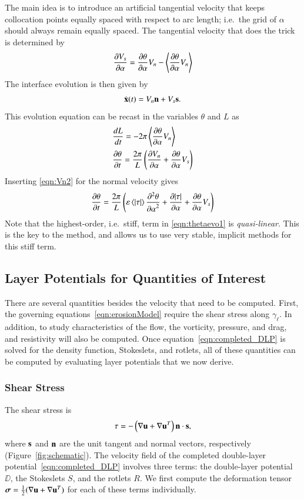 \documentclass[preprint, 10pt]{elsarticle}
\begin{document}
The main idea is to introduce an artificial tangential velocity that keeps collocation points equally spaced with respect to arc length; i.e.~the grid of $\alpha$ should always remain equally spaced. The tangential velocity that does the trick is determined by \cite{hou-low-she1994}
\begin{equation}
\pderiv{\Vs}{\alpha} = \thalpha \Vn - \mean{\thalpha \Vn}
\end{equation}
The interface evolution is then given by
\begin{equation}
\dot{\xx}(t) = \Vn \nn + \Vs \ss.
\end{equation}
This evolution equation can be recast in the variables $\theta$ and $L$ as
\begin{align}
\label{eqn:Levo1}
& \tderiv{L}{t} = - 2 \pi \mean{\thalpha \Vn} \\
\label{eqn:thetaevo0}
& \pderiv{\theta}{t} = \frac{2 \pi}{L} \left( \pderiv{\Vn}{\alpha} + \thalpha \Vs \right)
\end{align}
Inserting \eqref{eqn:Vn2} for the normal velocity gives
\begin{equation}
\label{eqn:thetaevo1}
\pderiv{\theta}{t} = \frac{2\pi}{L} \left(
\eps \mean{\atau} \ppd{\theta}{\alpha} + \pderiv{\atau}{\alpha} + \thalpha \Vs \right)
\end{equation}
Note that the highest-order, i.e.~stiff, term in \eqref{eqn:thetaevo1} is {\em quasi-linear}. This is the key to the {\thL} method, and allows us to use very stable, implicit methods for this stiff term. 


\subsection{Layer Potentials for Quantities of Interest}
\label{sec:qois}
There are several quantities besides the velocity that need to be
computed.  First, the governing equations~\eqref{eqn:erosionModel}
require the shear stress along $\gamma_\ell$.  In addition, to study
characteristics of the flow, the vorticity, pressure, and drag, and
resistivity will also be computed.  Once
equation~\eqref{eqn:completed_DLP} is solved for the density function,
Stokeslets, and rotlets, all of these quantities can be computed by
evaluating layer potentials that we now derive.

\subsubsection{Shear Stress}
The shear stress is
\begin{align*}
  \tau = -\left(\nabla \uu + \nabla \uu^T \right)\nn \cdot \ss,
\end{align*}
where $\ss$ and $\nn$ are the unit tangent and normal vectors,
respectively (Figure~\ref{fig:schematic}).  The velocity field of the
completed double-layer potential~\eqref{eqn:completed_DLP} involves
three terms: the double-layer potential $\DD$, the Stokeslets $S$, and
the rotlets $R$.  We first compute the deformation tensor $\ssigma =
\frac{1}{2}(\nabla\uu + \nabla\uu^T)$ for each of these terms
individually.
\end{document}
